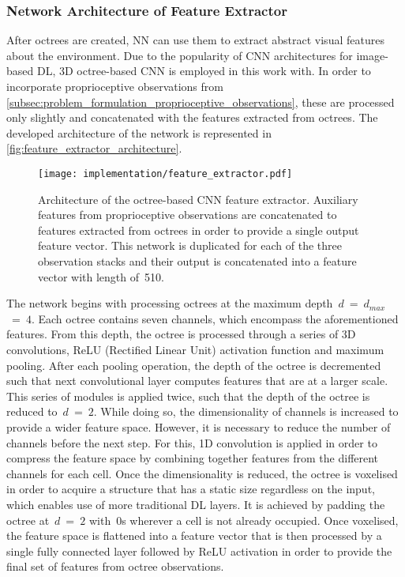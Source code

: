 \subsubsection{Network Architecture of Feature Extractor}

After octrees are created, NN can use them to extract abstract visual features about the environment. Due to the popularity of CNN architectures for image-based DL, 3D octree-based CNN is employed in this work with. In order to incorporate proprioceptive observations from \autoref{subsec:problem_formulation_proprioceptive_observations}, these are processed only slightly and concatenated with the features extracted from octrees. The developed architecture of the network is represented in \autoref{fig:feature_extractor_architecture}.

\begin{figure}[ht]
    \centering
    \texttt{[image: implementation/feature\_extractor.pdf]}
    \caption{Architecture of the octree-based CNN feature extractor. Auxiliary features from proprioceptive observations are concatenated to features extracted from octrees in order to provide a single output feature vector. This network is duplicated for each of the three observation stacks and their output is concatenated into a feature vector with length of~510.}
    \label{fig:feature_extractor_architecture}
\end{figure}

The network begins with processing octrees at the maximum depth~\(d\)~=~\(d_{max}\)~=~\(4\). Each octree contains seven channels, which encompass the aforementioned features. From this depth, the octree is processed through a series of 3D convolutions, ReLU (Rectified Linear Unit) activation function and maximum pooling. After each pooling operation, the depth of the octree is decremented such that next convolutional layer computes features that are at a larger scale. This series of modules is applied twice, such that the depth of the octree is reduced to~\(d\)~=~\(2\). While doing so, the dimensionality of channels is increased to provide a wider feature space. However, it is necessary to reduce the number of channels before the next step. For this, 1D convolution is applied in order to compress the feature space by combining together features from the different channels for each cell. Once the dimensionality is reduced, the octree is voxelised in order to acquire a structure that has a static size regardless on the input, which enables use of more traditional DL layers. It is achieved by padding the octree at~\(d\)~=~\(2\) with~0s wherever a cell is not already occupied. Once voxelised, the feature space is flattened into a feature vector that is then processed by a single fully connected layer followed by ReLU activation in order to provide the final set of features from octree observations.

